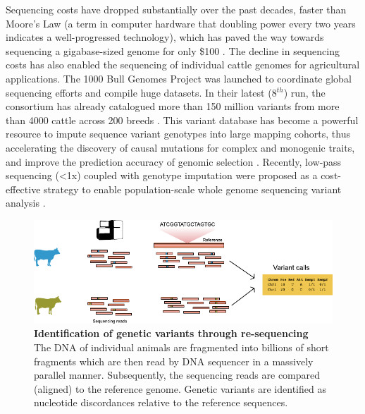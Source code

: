 \documentclass[../main.tex]{subfiles}
\begin{document}
Sequencing costs have dropped substantially over the past decades, faster than Moore’s Law (a term in computer hardware that doubling power every two years indicates a well-progressed technology), which has paved the way towards sequencing a gigabase-sized genome for only \$100 \citep{Regalado2020,Wetterstrand2020}. The decline in sequencing costs has also enabled the sequencing of individual cattle genomes for agricultural applications. The 1000 Bull Genomes Project was launched to coordinate global sequencing efforts and compile huge datasets.  In their latest  (8$^{th}$) run, the consortium has already catalogued more than 150 million variants from more than 4000 cattle across 200 breeds \citep{hayes20191000}. This variant database has become a powerful resource to impute sequence variant genotypes into large mapping cohorts, thus accelerating the discovery of causal mutations for complex and monogenic traits, and improve the prediction accuracy of genomic selection \citep{daetwyler2014whole}. Recently, low-pass sequencing (<1x) coupled with genotype imputation were proposed as a cost-effective strategy to enable population-scale whole genome sequencing variant analysis \citep{snelling2020assessment}. \\

\bigskip

\begin{figure}[!htb]
    \centering
    \includegraphics[width=\textwidth]{intro/fig1.pdf}
        \vspace{3mm}
        \caption[Identification of genetic variants through genome sequencing]{\textbf{Identification of genetic variants through re-sequencing} \\
        \footnotesize{The DNA of individual animals are fragmented into billions of short fragments which are then read by DNA sequencer in a massively parallel manner. Subsequently, the sequencing reads are compared (aligned) to the reference genome. Genetic variants are identified as nucleotide discordances relative to the reference sequences.}}
        \label{fig11:reseq}
\end{figure}
\end{document}
